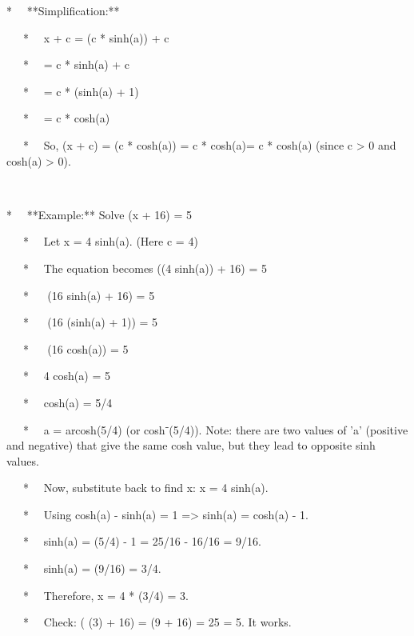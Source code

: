 \documentclass{article}
\newcommand{\nonconverted}[1]{\mbox{}}
\begin{document}
* \ \ **Simplification:**

\ \ \ * \ \ x{\texttwosuperior} + c{\texttwosuperior} = (c *
sinh(a)){\texttwosuperior} + c{\texttwosuperior}

\ \ \ * \ \ = c{\texttwosuperior} * sinh{\texttwosuperior}(a) +
c{\texttwosuperior}

\ \ \ * \ \ = c{\texttwosuperior} * (sinh{\texttwosuperior}(a) + 1)

\ \ \ * \ \ = c{\texttwosuperior} * cosh{\texttwosuperior}(a)

\ \ \ * \ \ So,  \nonconverted{sqrt} (x{\texttwosuperior} +
c{\texttwosuperior}) =  \nonconverted{sqrt} (c{\texttwosuperior} *
cosh{\texttwosuperior}(a)) = \textbar c * cosh(a)\textbar  = c * cosh(a)
(since c > 0 and cosh(a) > 0).

\

* \ \ **Example:** Solve  \nonconverted{sqrt} (x{\texttwosuperior} + 16) = 5

\ \ \ * \ \ Let x = 4 sinh(a). (Here c = 4)

\ \ \ * \ \ The equation becomes  \nonconverted{sqrt} ((4
sinh(a)){\texttwosuperior} + 16) = 5

\ \ \ * \ \  \nonconverted{sqrt} (16 sinh{\texttwosuperior}(a) + 16) = 5

\ \ \ * \ \  \nonconverted{sqrt} (16 (sinh{\texttwosuperior}(a) + 1)) = 5

\ \ \ * \ \  \nonconverted{sqrt} (16 cosh{\texttwosuperior}(a)) = 5

\ \ \ * \ \ 4 cosh(a) = 5

\ \ \ * \ \ cosh(a) = 5/4

\ \ \ * \ \ a = arcosh(5/4) (or cosh⁻{\textonesuperior}(5/4)). Note: there
are two values of 'a' (positive and negative) that give the same cosh value,
but they lead to opposite sinh values.

\ \ \ * \ \ Now, substitute back to find x: x = 4 sinh(a).

\ \ \ * \ \ Using cosh{\texttwosuperior}(a) - sinh{\texttwosuperior}(a) = 1
=> sinh{\texttwosuperior}(a) = cosh{\texttwosuperior}(a) - 1.

\ \ \ * \ \ sinh{\texttwosuperior}(a) = (5/4){\texttwosuperior} - 1 = 25/16 -
16/16 = 9/16.

\ \ \ * \ \ sinh(a) = {\pm} \nonconverted{sqrt} (9/16) = {\pm}3/4.

\ \ \ * \ \ Therefore, x = 4 * ({\pm}3/4) = {\pm}3.

\ \ \ * \ \ Check:  \nonconverted{sqrt} ( ({\pm}3){\texttwosuperior} + 16) = 
\nonconverted{sqrt} (9 + 16) =  \nonconverted{sqrt} 25 = 5. It works.
\end{document}
